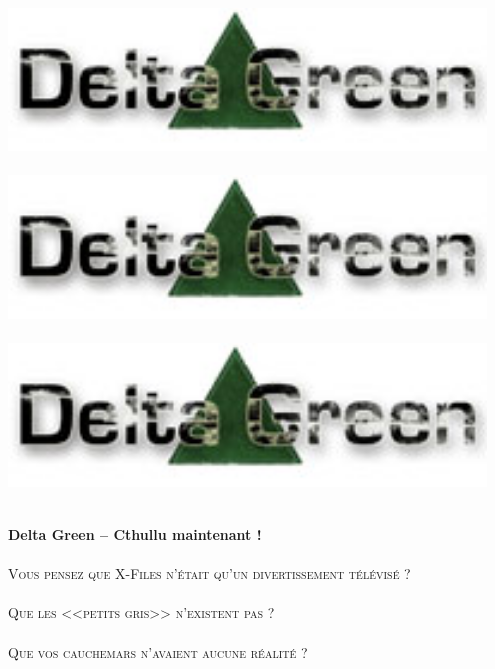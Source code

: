 \documentclass[40pt,twoside,a4paper]{article}
\def\confidentialDGTIKZ{%
	\begin{tikzpicture}[remember picture,overlay]
	\node[rotate=60,scale=7.5,text opacity=0.2] at (current page.center) {Confidential -- Delta Green};
	\end{tikzpicture}
}%
\begin{document}
\setlength\parindent{0pt}


~\\

\begin{minipage}[ht]{0.30\textwidth}
	\includegraphics[width=0.95\textwidth]{../img/logo_DG.jpg} ~\\~\\
	\includegraphics[width=0.95\textwidth]{../img/logo_DG.jpg} ~\\~\\
	\includegraphics[width=0.95\textwidth]{../img/logo_DG.jpg} ~\\~\\
\end{minipage} \hfill \begin{minipage}[ht]{0.65\textwidth}
	\textbf{\huge Delta Green -- Cthullu maintenant !} ~\\~\\
	\textsc{\LARGE Vous pensez que X-Files n'{\'e}tait qu'un divertissement t{\'e}l{\'e}vis{\'e} ?}~\\~\\
	\textsc{\LARGE Que les <<petits gris>>  n'existent pas ?}~\\~\\
	\textsc{\LARGE Que vos cauchemars n'avaient aucune r{\'e}alit{\'e} ?}~\\~\\
	

\end{minipage}
\end{document}

